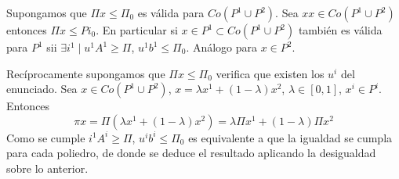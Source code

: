 \documentclass[MIOP.tex]{subfiles}
\begin{document}
\begin{dem}
Supongamos que $\Pi x \leq \Pi_0$ es válida para $ Co(P^1\cup P^2)$. Sea $xx \in Co(P^1\cup P^2)$ entonces $\Pi x \leq Pi_0$. En particular si $x\in P^1 \subset Co(P^1\cup P^2)$ también es válida para $P^1$ sii $\exists i^1\mid u^1 A^1 \geq \Pi$, $u^1 b^1 \leq \Pi_0$. Análogo para $x\in P^2$.

Recíprocamente supongamos que $\Pi x \leq \Pi_0$ verifica que existen los $u^i$ del enunciado. Sea $x\in Co(P^1\cup P^2)$, $x=\lambda x^1 +(1-\lambda)x^2$, $\lambda \in [0,1]$, $x^i\in P^i$. Entonces 
$$
\pi x = \Pi (\lambda x^1 +(1-\lambda)x^2) = \lambda \Pi x^1 +(1-\lambda)\Pi x^2
$$
Como se cumple $i^1 A^i \geq \Pi$, $u^i b^i \leq \Pi_0$ es equivalente a que la igualdad se cumpla para cada poliedro, de donde se deduce el resultado aplicando la desigualdad sobre lo anterior.
\end{dem}
\end{document}
